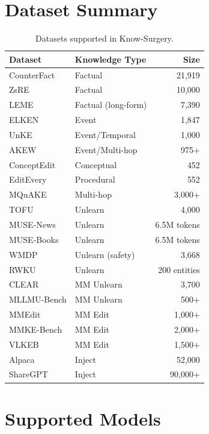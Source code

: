 \section{Dataset Summary}
\label{sec:appendix-data}

\begin{table}[t]
\centering
\footnotesize
\renewcommand{\arraystretch}{0.9}
\begin{tabular}{llr}
\toprule
\textbf{Dataset} & \textbf{Knowledge Type} & \textbf{Size} \\
\midrule
CounterFact & Factual & 21,919 \\
ZsRE & Factual & 10,000 \\
LEME & Factual (long-form) & 7,390 \\
ELKEN & Event & 1,847 \\
UnKE & Event/Temporal & 1,000 \\
AKEW & Event/Multi-hop & 975+ \\
ConceptEdit & Conceptual & 452 \\
EditEvery & Procedural & 552 \\
MQuAKE & Multi-hop & 3,000+ \\
\midrule
TOFU & Unlearn & 4,000 \\
MUSE-News & Unlearn & 6.5M tokens \\
MUSE-Books & Unlearn & 6.5M tokens \\
WMDP & Unlearn (safety) & 3,668 \\
RWKU & Unlearn & 200 entities \\
\midrule
CLEAR & MM Unlearn & 3,700 \\
MLLMU-Bench & MM Unlearn & 500+ \\
MMEdit & MM Edit & 1,000+ \\
MMKE-Bench & MM Edit & 2,000+ \\
VLKEB & MM Edit & 1,500+ \\
\midrule
Alpaca & Inject & 52,000 \\
ShareGPT & Inject & 90,000+ \\
\bottomrule
\end{tabular}
\caption{Datasets supported in Know-Surgery.}
\label{tab:all-data}
\end{table}

\section{Supported Models}
\label{sec:appendix-models}

